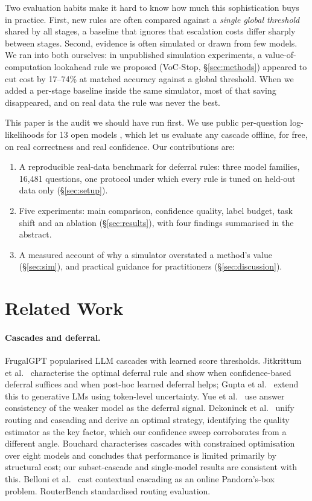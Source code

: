 \documentclass[10pt,twocolumn]{article}
\begin{document}
Two evaluation habits make it hard to know how much this sophistication buys in practice. First, new
rules are often compared against a \emph{single global threshold} shared by all stages, a baseline
that ignores that escalation costs differ sharply between stages. Second, evidence is often simulated
or drawn from few models. We ran into both ourselves: in unpublished simulation experiments, a
value-of-computation lookahead rule we proposed (VoC-Stop, \S\ref{sec:methods}) appeared to cut cost by
17--74\% at matched accuracy against a global threshold. When we added a per-stage baseline inside the
same simulator, most of that saving disappeared, and on real data the rule was never the best.

This paper is the audit we should have run first. We use public per-question log-likelihoods for 13
open models \cite{openllmlb}, which let us evaluate any cascade offline, for free, on real correctness
and real confidence. Our contributions are:
\begin{enumerate}\itemsep1pt
\item A reproducible real-data benchmark for deferral rules: three model families, 16{,}481 questions,
  one protocol under which every rule is tuned on held-out data only (\S\ref{sec:setup}).
\item Five experiments: main comparison, confidence quality, label budget, task shift and an ablation
  (\S\ref{sec:results}), with four findings summarised in the abstract.
\item A measured account of why a simulator overstated a method's value (\S\ref{sec:sim}), and practical
  guidance for practitioners (\S\ref{sec:discussion}).
\end{enumerate}

\section{Related Work}
\paragraph{Cascades and deferral.} FrugalGPT \cite{frugalgpt} popularised LLM cascades with learned
score thresholds. Jitkrittum et al.\ \cite{jitkrittum2023} characterise the optimal deferral rule and
show when confidence-based deferral suffices and when post-hoc learned deferral helps; Gupta et
al.\ \cite{gupta2024} extend this to generative LMs using token-level uncertainty. Yue et
al.\ \cite{yue2024} use answer consistency of the weaker model as the deferral signal. Dekoninck et
al.\ \cite{dekoninck2025} unify routing and cascading and derive an optimal strategy, identifying the
quality estimator as the key factor, which our confidence sweep corroborates from a different angle.
Bouchard \cite{bouchard2026} characterises cascades with constrained optimisation over eight models and
concludes that performance is limited primarily by structural cost; our subset-cascade and
single-model results are consistent with this. Belloni et al.\ \cite{belloni2026} cast contextual
cascading as an online Pandora's-box problem. RouterBench \cite{routerbench} standardised
routing evaluation.
\end{document}
